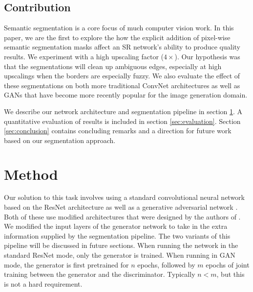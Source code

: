 \documentclass[10pt,twocolumn,letterpaper]{article}
\begin{document}
\subsection{Contribution}
Semantic segmentation is a core focus of much computer vision work. In this
paper, we are the first to explore the how the explicit addition of pixel-wise
semantic segmentation masks affect an SR network's ability to produce quality
results. We experiment with a high upscaling factor ($4 \times$). Our
hypothesis was that the segmentations will clean up ambiguous edges, especially
at high upscalings when the borders are especially fuzzy. We also evaluate the
effect of these segmentations on both more traditional ConvNet architectures as
well as GANs that have become more recently popular for the image generation
domain.

We describe our network architecture and segmentation pipeline in section
\ref{sec:method}. A quantitative evaluation of results is included in section
\ref{sec:evaluation}. Section \ref{sec:conclusion} contains concluding remarks
and a direction for future work based on our segmentation approach.


\section{Method}
\label{sec:method}

Our solution to this task involves using a standard convolutional neural
network based on the ResNet architecture \cite{ResNet} as well as a generative
adversarial network \cite{GAN}. Both of these use modified architectures that
were designed by the authors of \cite{SRGAN}. We modified the input layers of
the generator network to take in the extra information supplied by the
segmentation pipeline. The two variants of this pipeline will be discussed in
future sections. When running the network in the standard ResNet mode, only the
generator is trained. When running in GAN mode, the generator is first
pretrained for $n$ epochs, followed by $m$ epochs of joint training between the
generator and the discriminator. Typically $n < m$, but this is not a hard
requirement.
\end{document}
